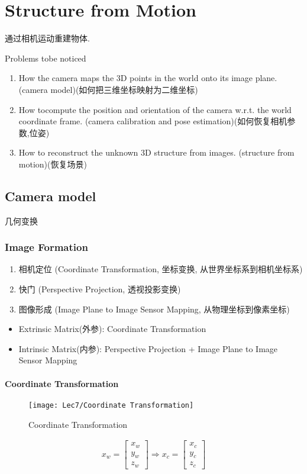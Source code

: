 \chapter{Structure from Motion}
通过相机运动重建物体.

Problems tobe noticed
\begin{enumerate}
    \item How the camera maps the 3D points in the world onto its image plane. (camera model)(如何把三维坐标映射为二维坐标)
    \item How tocompute the position and orientation of the camera w.r.t. the world coordinate frame. (camera calibration and pose estimation)(如何恢复相机参数,位姿)
    \item How to reconstruct the unknown 3D structure from images.  (structure from motion)(恢复场景)
\end{enumerate}

\section{Camera model}
几何变换
\subsection{Image Formation}
\begin{enumerate}
    \item 相机定位 (Coordinate Transformation, 坐标变换, 从世界坐标系到相机坐标系)
    \item 快门 (Perspective Projection, 透视投影变换)
    \item 图像形成 (Image Plane to Image Sensor Mapping, 从物理坐标到像素坐标)
\end{enumerate}

\begin{itemize}
    \item Extrinsic Matrix(外参): Coordinate Transformation
    \item Intrinsic Matrix(内参): Perspective Projection + Image Plane to Image Sensor Mapping
\end{itemize}

\subsubsection{Coordinate Transformation}
\begin{figure}[H]
    \centering
    \texttt{[image: Lec7/Coordinate Transformation]}
    \caption{Coordinate Transformation}
\end{figure}
\begin{align*}
    x_w=\begin{bmatrix}
        x_w\\y_w\\z_w
    \end{bmatrix} \Longrightarrow x_c=\begin{bmatrix}
        x_c\\y_c\\z_c
    \end{bmatrix}
\end{align*}

